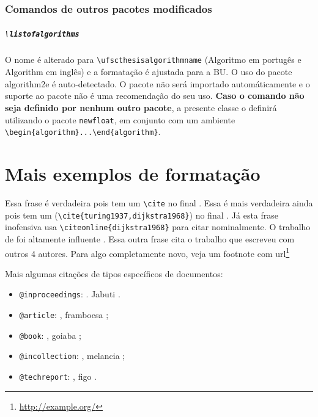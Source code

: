 \documentclass[embeddedlogo]{ufsc-thesis-rn46-2019}
\newcommand{\lacmd}[1]{\texttt{\textbackslash{}#1}}
\begin{document}
\subsection{Comandos de outros pacotes modificados}

\paragraph*{\lacmd{listofalgorithms}} O nome é alterado para
\lacmd{ufscthesisalgorithmname} (Algoritmo em portugês e Algorithm em inglês) e
a formatação é ajustada para a BU. O uso do pacote algorithm2e é
auto-detectado. O pacote não será importado automáticamente e o suporte ao
pacote não é uma recomendação do seu uso. \textbf{Caso o comando não seja
  definido por nenhum outro pacote}, a presente classe o definirá utilizando o
pacote \texttt{newfloat}, em conjunto com um ambiente
\lacmd{begin\{algorithm\}...\lacmd{end\{algorithm\}}}.


\chapter{Mais exemplos de formatação}
\label{ch:ex}

Essa frase é verdadeira pois tem um \lacmd{cite} no final \cite{turing1937}. Essa
é mais verdadeira ainda pois tem um (\lacmd{cite\{turing1937,dijkstra1968\}}) no
final \cite{turing1937,dijkstra1968}. Já esta frase inofensiva usa
\lacmd{citeonline\{dijkstra1968\}} para citar 
nominalmente. O trabalho de  foi altamente influente
\cite{diffie1976}. Essa outra frase cita o trabalho que 
escreveu com outros 4 autores. Para algo completamente novo, veja um footnote
com url\footnote{\url{http://example.org/}}

Mais algumas citações de tipos específicos de documentos:
\begin{itemize}
\item \texttt{@inproceedings}: . Jabuti
  \cite{Ullman1989magic}.
\item \texttt{@article}: , framboesa \cite{Distefano2019};
\item \texttt{@book}: , goiaba \cite{Abiteboul1995};
\item \texttt{@incollection}: , melancia \cite{Forgy1989};
\item \texttt{@techreport}: , figo \cite{rdf11}.
\end{itemize}
\end{document}
